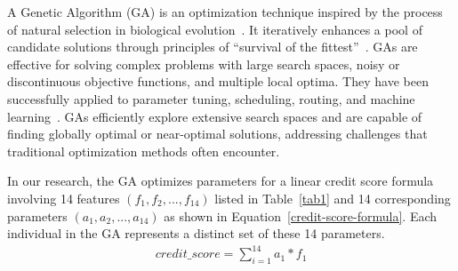 \documentclass[runningheads]{llncs}
\begin{document}
{A Genetic Algorithm (GA) is an optimization technique inspired by the process of natural selection in biological evolution~\cite{kingma2014adam}. It iteratively enhances a pool of candidate solutions through principles of ``survival of the fittest''~\cite{zbMATH03584897}. GAs are effective for solving complex problems with large search spaces, noisy or discontinuous objective functions, and multiple local optima. They have been successfully applied to parameter tuning, scheduling, routing, and machine learning~\cite{katoch2021review}. GAs efficiently explore extensive search spaces and are capable of finding globally optimal or near-optimal solutions, addressing challenges that traditional optimization methods often encounter.

In our research, the GA optimizes parameters for a linear credit score formula involving 14 features $(f_1, f_2, ..., f_{14})$ listed in Table~\ref{tab1} and 14 corresponding parameters $(a_1, a_2, ..., a_{14})$ as shown in Equation~\ref{credit-score-formula}. Each individual in the GA represents a distinct set of these 14 parameters.
\begin{equation}
\label{credit-score-formula}
\begin{split}
    credit\_score = \sum_{i=1}^{14} a_1*f_1
\end{split}
\end{equation}




}
\end{document}
